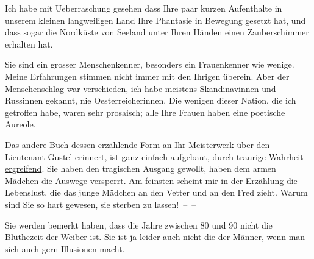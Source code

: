 \pstart
           Ich habe mit Ueberraschung gesehen dass Ihre paar kurzen Aufenthalte in unserem
               kleinen langweiligen Land
               Ihre Phantasie in Bewegung gesetzt hat, und dass sogar die Nordküste von Seeland unter Ihren Händen einen Zauberschimmer erhalten hat.\pend
           
\pstart
           Sie sind ein grosser Menschenkenner, besonders ein Frauenkenner wie wenige. Meine
               Erfahrungen stimmen nicht immer mit den Ihrigen überein. Aber der Menschenschlag war
               verschieden, ich habe meistens Skandinavinnen und
                  Russinnen gekannt, nie Oesterreicherinnen. Die wenigen dieser Nation, die ich getroffen
               habe, waren sehr prosaisch; alle Ihre Frauen haben eine poetische Aureole.\pend
           
\pstart
           Das andere Buch dessen
               erzählende Form an Ihr Meisterwerk über den {\pb}Lieutenant Gustel erinnert, ist ganz einfach
               aufgebaut, durch traurige Wahrheit \uline{ergreifend}. Sie
               haben den tragischen Ausgang gewollt, haben dem armen Mädchen die Auswege versperrt.
               Am feinsten scheint mir in der Erzählung die Lebenslust, die das junge Mädchen an den Vetter und an den Fred zieht. Warum sind Sie so hart gewesen,
               sie sterben zu lassen! – –\pend
           
\pstart
           Sie werden bemerkt haben, dass die Jahre zwischen 80 und 90 nicht die Blüthezeit der
               Weiber ist. Sie ist ja leider auch nicht die der Männer, wenn man sich auch gern
               Illusionen macht.\pend
           

